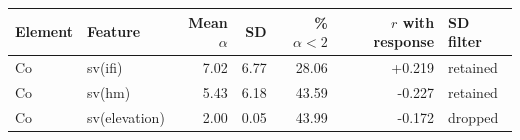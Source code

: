 \begin{tabular}{llrrrrl}
\hline
Element & Feature & Mean $\alpha$ & SD & \% $\alpha<2$ & $r$ with response & SD filter \\
\hline
Co & sv(ifi) & 7.02 & 6.77 & 28.06 & +0.219 & retained \\
Co & sv(hm) & 5.43 & 6.18 & 43.59 & -0.227 & retained \\
Co & sv(elevation) & 2.00 & 0.05 & 43.99 & -0.172 & dropped \\
\hline
\end{tabular}
